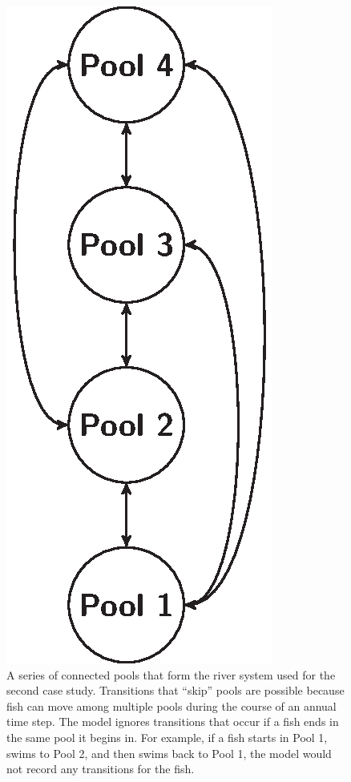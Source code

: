 \documentclass{article}[12pt]
\begin{document}
\begin{figure}[htbp]
   \centering  
   \includegraphics[width=0.25\textheight]{Figure4.eps} %
   \caption{A series of connected pools that form the river system used for the second case study. Transitions that ``skip'' pools are possible because fish can move among multiple pools during the course of an annual time step. The model ignores transitions that occur if a fish ends in the same pool it begins in. For example, if a fish starts in Pool 1, swims to Pool 2, and then swims back to Pool 1, the model would not record any transitions for the fish.}
   \label{fig:seriesPool}
\end{figure}
\end{document}

